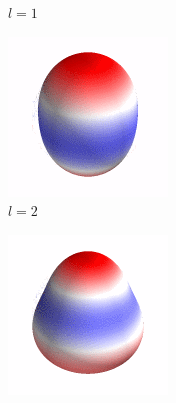 \begin{figure}[tb]
\begin{subfigure}[b]{0.25\linewidth}
        \caption*{$l=1$}
    \end{subfigure}%
    \begin{subfigure}[b]{0.25\linewidth}
        \includegraphics[width=\linewidth]{figures/spherical_harmonics/2_0.png}
        \caption*{$l=2$}
    \end{subfigure}%
    \begin{subfigure}[b]{0.25\linewidth}
        \includegraphics[width=\linewidth]{figures/spherical_harmonics/3_0.png}

\end{subfigure}
\end{figure}
